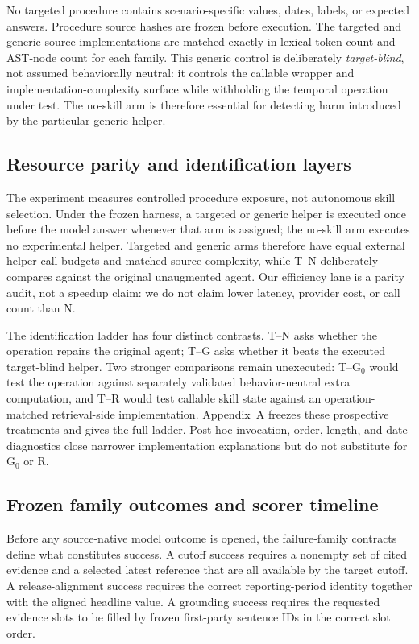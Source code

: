 No targeted procedure contains scenario-specific values, dates, labels, or expected answers. Procedure source hashes are frozen before execution. The targeted and generic source implementations are matched exactly in lexical-token count and AST-node count for each family. This generic control is deliberately \emph{target-blind}, not assumed behaviorally neutral: it controls the callable wrapper and implementation-complexity surface while withholding the temporal operation under test. The no-skill arm is therefore essential for detecting harm introduced by the particular generic helper.

\subsection{Resource parity and identification layers}
The experiment measures controlled procedure exposure, not autonomous skill selection. Under the frozen harness, a targeted or generic helper is executed once before the model answer whenever that arm is assigned; the no-skill arm executes no experimental helper. Targeted and generic arms therefore have equal external helper-call budgets and matched source complexity, while T--N deliberately compares against the original unaugmented agent. Our efficiency lane is a parity audit, not a speedup claim: we do not claim lower latency, provider cost, or call count than N.

The identification ladder has four distinct contrasts. T--N asks whether the operation repairs the original agent; T--G asks whether it beats the executed target-blind helper. Two stronger comparisons remain unexecuted: T--G$_0$ would test the operation against separately validated behavior-neutral extra computation, and T--R would test callable skill state against an operation-matched retrieval-side implementation. Appendix~A freezes these prospective treatments and gives the full ladder. Post-hoc invocation, order, length, and date diagnostics close narrower implementation explanations but do not substitute for G$_0$ or R.

\subsection{Frozen family outcomes and scorer timeline}
Before any source-native model outcome is opened, the failure-family contracts define what constitutes success. A cutoff success requires a nonempty set of cited evidence and a selected latest reference that are all available by the target cutoff. A release-alignment success requires the correct reporting-period identity together with the aligned headline value. A grounding success requires the requested evidence slots to be filled by frozen first-party sentence IDs in the correct slot order.

